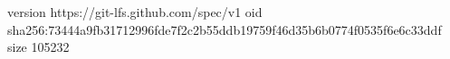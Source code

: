 version https://git-lfs.github.com/spec/v1
oid sha256:73444a9fb31712996fde7f2c2b55ddb19759f46d35b6b0774f0535f6e6c33ddf
size 105232
